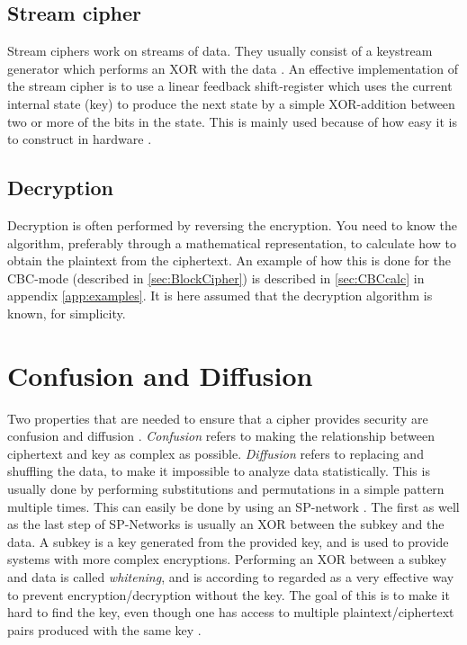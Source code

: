 \subsection{Stream cipher} \label{sec:StreamCipher}
Stream ciphers work on streams of data. They usually consist of a 
keystream generator which performs an XOR with the data 
\cite[pp. 67]{Simmons:1992}. An effective implementation of the stream 
cipher is to use a linear feedback shift-register which uses the 
current internal state (key) to produce the next state by a simple 
XOR-addition between two or more of the bits in the state. This is 
mainly used because of how easy it is to construct in hardware 
\citep{LFSR:2008}.

\subsection{Decryption}
Decryption is often performed by reversing the encryption. You need to 
know the algorithm, preferably through a mathematical representation, 
to calculate how to obtain the plaintext from the ciphertext. An 
example of how this is done for the CBC-mode (described in 
\ref{sec:BlockCipher}) is described in \ref{sec:CBCcalc} in appendix 
\ref{app:examples}. It is here assumed that the decryption algorithm 
is known, for simplicity. 
\section{Confusion and Diffusion}\label{ch:ConfDiff}
Two properties that are needed to ensure that a cipher provides 
security are confusion and diffusion \citep{Shannon:1949}. 
\emph{Confusion} refers to making the relationship between ciphertext 
and key as complex as possible. \emph{Diffusion} refers to replacing 
and shuffling the data, to make it impossible to analyze data 
statistically. This is usually done by performing substitutions and 
permutations in a simple pattern multiple times. This can easily be 
done by using an SP-network \citep[pp. 74--79]{Stinson:2006}. The first
 as well as the last step of SP-Networks is usually an XOR between 
the subkey and the data. A subkey is a key generated from the provided 
key, and is used to provide systems with more complex encryptions. 
Performing an XOR between a subkey and data is called \emph{whitening}, 
and is according to \citet[p. 75]{Stinson:2006} regarded as a very 
effective way to prevent encryption/decryption without the key. 
The goal of this is to make it hard to find the key, even though one 
has access to multiple plaintext/ciphertext pairs produced with the 
same key \citep{Shannon:1949}.

